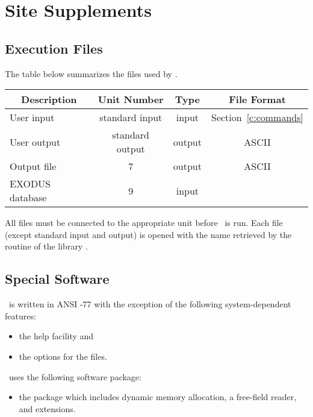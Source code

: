 \chapter{Site Supplements} \label{a:site}



\section{Execution Files} \label{exec:files}

The table below summarizes the files used by \numbers.

\begin{center} \begin{tabular}{||l|c|c|c||}
\hline
\multicolumn{1}{||c}{Description} &
\multicolumn{1}{|c}{Unit Number} &
\multicolumn{1}{|c}{Type} &
\multicolumn{1}{|c||}{File Format} \\
\hline
     User input & standard input  & input  & Section~\ref{c:commands} \\
    User output & standard output & output & ASCII \\
Output file     &               7 & output & ASCII \\
EXODUS database &               9 & input  & \\
\hline
\end{tabular} \end{center}

All files must be connected to the appropriate unit before
\numbers\ is run. Each file (except standard input and output) is
opened with the name retrieved by the  routine of the
 library \cite{supes}.

\section{Special Software}

\numbers\ is written in ANSI -77 \cite{F77}
with the exception of the following system-dependent features:
\setlength{\itemsep}{\medskipamount} \begin{itemize}
\item the  help facility and
\item the  options for the files.
\end{itemize}

\numbers\ uses the following software package:
\setlength{\itemsep}{\medskipamount} \begin{itemize}
\item the  package \cite{supes} which includes dynamic
memory allocation, a free-field reader, and 
extensions.
\end{itemize}
